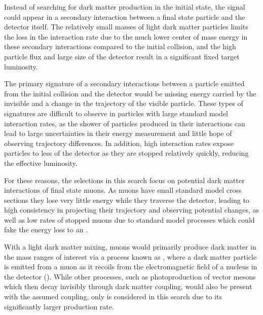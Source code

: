 Instead of searching for dark matter production in the initial state, the signal could appear in a secondary interaction between a final state particle and the detector itself.
The relatively small masses of light dark matter particles limits the loss in the interaction rate due to the much lower center of mass energy in these secondary interactions compared to the initial collision, and the high particle flux and large size of the detector result in a significant fixed target luminosity.

The primary signature of a secondary interactions between a particle emitted from the initial collision and the detector would be missing energy carried by the invisible \aprime and a change in the trajectory of the visible particle.
These types of signatures are difficult to observe in particles with large standard model interaction rates, as the shower of particles produced in their interactions can lead to large uncertainties in their energy measurement and little hope of observing trajectory differences.
In addition, high interaction rates expose particles to less of the detector as they are stopped relatively quickly, reducing the effective luminosity.

For these reasons, the selections in this search focus on potential dark matter interactions of final state muons.
As muons have small standard model cross sections they lose very little energy while they traverse the detector, leading to high consistency in projecting their trajectory and observing potential changes, as well as low rates of stopped muons due to standard model processes which could fake the energy loss to an \aprime.

With a light dark matter mixing, muons would primarily produce dark matter in the mass ranges of interest via a process known as \dbrem, where a dark matter particle is emitted from a muon as it recoils from the electromagnetic field of a nucleus in the detector ().
While other processes, such as photoproduction of vector mesons which then decay invisibly through dark matter coupling, would also be present with the assumed coupling, only \dbrem is considered in this search due to its significantly larger production rate.

